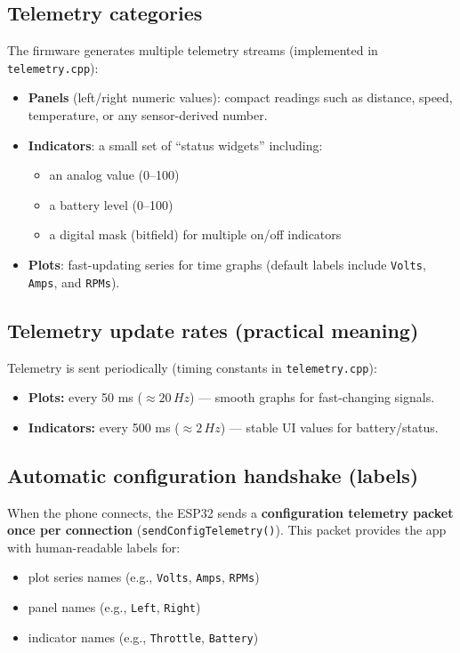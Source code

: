 \subsection{Telemetry categories}
The firmware generates multiple telemetry streams (implemented in \texttt{telemetry.cpp}):

\begin{itemize}
    \item \textbf{Panels} (left/right numeric values): compact readings such as distance, speed, temperature, or any sensor-derived number.
    \item \textbf{Indicators}: a small set of ``status widgets'' including:
    \begin{itemize}
        \item an analog value (0--100)
        \item a battery level (0--100)
        \item a digital mask (bitfield) for multiple on/off indicators
    \end{itemize}
    \item \textbf{Plots}: fast-updating series for time graphs (default labels include \texttt{Volts}, \texttt{Amps}, and \texttt{RPMs}).
\end{itemize}

\subsection{Telemetry update rates (practical meaning)}
Telemetry is sent periodically (timing constants in \texttt{telemetry.cpp}):

\begin{itemize}
    \item \textbf{Plots:} every 50 ms (\(\approx 20\,Hz\)) --- smooth graphs for fast-changing signals.
    \item \textbf{Indicators:} every 500 ms (\(\approx 2\,Hz\)) --- stable UI values for battery/status.
\end{itemize}

\subsection{Automatic configuration handshake (labels)}
When the phone connects, the ESP32 sends a \textbf{configuration telemetry packet once per connection}
(\texttt{sendConfigTelemetry()}). This packet provides the app with human-readable labels for:

\begin{itemize}
    \item plot series names (e.g., \texttt{Volts}, \texttt{Amps}, \texttt{RPMs})
    \item panel names (e.g., \texttt{Left}, \texttt{Right})
    \item indicator names (e.g., \texttt{Throttle}, \texttt{Battery})
\end{itemize}

